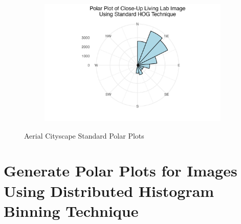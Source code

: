 \documentclass[
  letterpaper,
  DIV=11,
  numbers=noendperiod]{scrreprt}
\begin{document}
\begin{figure}
\begin{minipage}{0.33\linewidth}
\begin{figure}[H]
{}


\end{figure}%

\end{minipage}%
%
\begin{minipage}{0.33\linewidth}

\begin{figure}[H]

{\centering \includegraphics{images/plots/grass/close_up_living_lab_standard_polar_plot.jpg}

}


\end{figure}%

\end{minipage}%

\caption{\label{fig-grass-standard-polar}Aerial Cityscape Standard Polar
Plots}

\end{figure}%

\section{Generate Polar Plots for Images Using Distributed Histogram
Binning
Technique}\label{generate-polar-plots-for-images-using-distributed-histogram-binning-technique-1}
\end{document}
